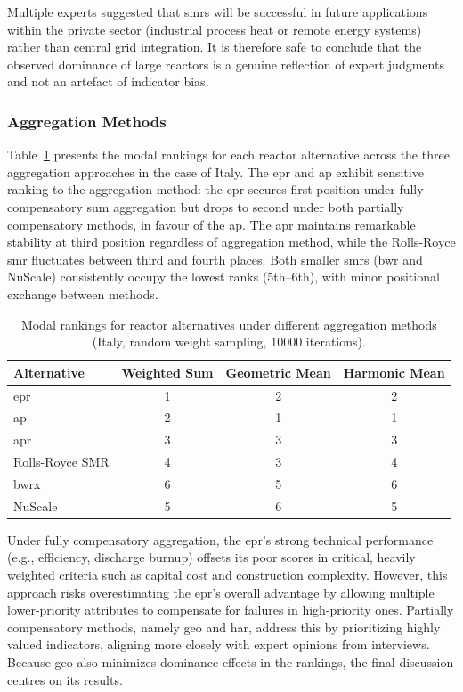 Multiple experts suggested that \glspl{smr} will be successful in future applications within the private sector (industrial process heat or remote energy systems) rather than central grid integration. It is therefore safe to conclude that the observed dominance of large reactors is a genuine reflection of expert judgments and not an artefact of indicator bias.


\subsubsection{Aggregation Methods}
Table~\ref{tab:aggregation_comparison} presents the modal rankings for each reactor alternative across the three aggregation approaches in the case of Italy. The \gls{epr} and \gls{ap} exhibit sensitive ranking to the aggregation method: the \gls{epr} secures first position under fully compensatory \gls{sum} aggregation but drops to second under both partially compensatory methods, in favour of the \gls{ap}. The \gls{apr} maintains remarkable stability at third position regardless of aggregation method, while the Rolls-Royce \gls{smr} fluctuates between third and fourth places. Both smaller \glspl{smr} (\gls{bwr} and NuScale) consistently occupy the lowest ranks (5th--6th), with minor positional exchange between methods.

\begin{table}[htbp]
\centering
\caption{Modal rankings for reactor alternatives under different aggregation methods (Italy, random weight sampling, 10000 iterations).}
\label{tab:aggregation_comparison}
\begin{tabular}{lccc}
\toprule
\textbf{Alternative} & \textbf{Weighted Sum} & \textbf{Geometric Mean} & \textbf{Harmonic Mean} \\
\midrule
\gls{epr}       & 1 & 2 & 2 \\
\gls{ap}        & 2 & 1 & 1 \\
\gls{apr}       & 3 & 3 & 3 \\
Rolls-Royce SMR & 4 & 3 & 4 \\
\gls{bwrx}      & 6 & 5 & 6 \\
NuScale         & 5 & 6 & 5 \\
\bottomrule
\end{tabular}
\end{table}

Under fully compensatory aggregation, the \gls{epr}’s strong technical performance (e.g., efficiency, discharge burnup) offsets its poor scores in critical, heavily weighted criteria such as capital cost and construction complexity. However, this approach risks overestimating the \gls{epr}’s overall advantage by allowing multiple lower-priority attributes to compensate for failures in high-priority ones. Partially compensatory methods, namely \gls{geo} and \gls{har}, address this by prioritizing highly valued indicators, aligning more closely with expert opinions from interviews. Because \gls{geo} also minimizes dominance effects in the rankings, the final discussion centres on its results.

